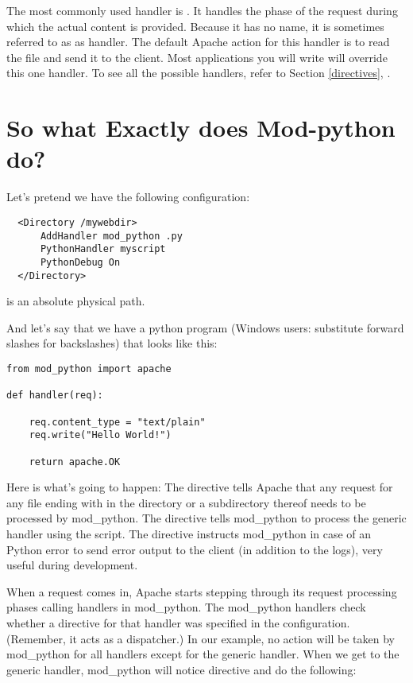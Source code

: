 The most commonly used handler is . It handles the
phase of the request during which the actual content is
provided. Because it has no name, it is sometimes referred to as as
 handler. The default Apache action for this handler is
to read the file and send it to the client. Most applications you will
write will override this one handler. To see all the possible
handlers, refer to Section \ref{directives},
.

\section{So what Exactly does Mod-python do?\label{tut-what-it-do}}

Let's pretend we have the following configuration: 
\begin{verbatim}
  <Directory /mywebdir>
      AddHandler mod_python .py
      PythonHandler myscript
      PythonDebug On
  </Directory>
\end{verbatim}

  is an absolute physical path. 

And let's say that we have a python program (Windows users: substitute
forward slashes for backslashes)  that looks like
this:

\begin{verbatim}
from mod_python import apache

def handler(req):

    req.content_type = "text/plain"
    req.write("Hello World!")

    return apache.OK
\end{verbatim}    

Here is what's going to happen: The  directive tells
Apache that any request for any file ending with  in the
 directory or a subdirectory thereof needs to be
processed by mod_python. The  directive
tells mod_python to process the generic handler using the
 script. The  directive instructs
mod_python in case of an Python error to send error output to the
client (in addition to the logs), very useful during development.

When a request comes in, Apache starts stepping through its request
processing phases calling handlers in mod_python. The mod_python
handlers check whether a directive for that handler was specified in
the configuration. (Remember, it acts as a dispatcher.)  In our
example, no action will be taken by mod_python for all handlers except
for the generic handler. When we get to the generic handler,
mod_python will notice  directive and do
the following:

